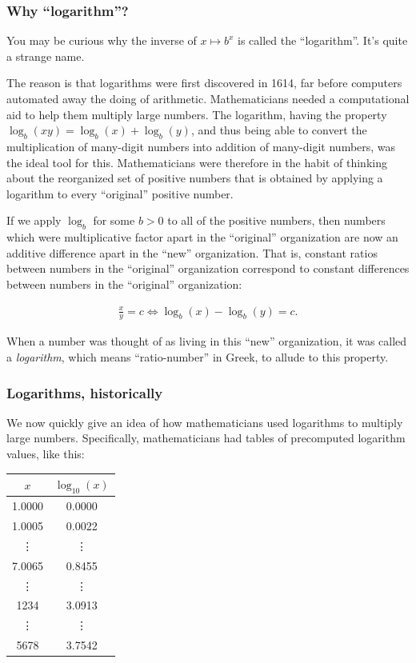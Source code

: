 \subsubsection*{Why ``logarithm''?}

You may be curious why the inverse of $x \mapsto b^x$ is called the ``logarithm''. It's quite a strange name.

The reason is that logarithms were first discovered in 1614, far before computers automated away the doing of arithmetic. Mathematicians needed a computational aid to help them multiply large numbers. The logarithm, having the property $\log_b(xy) = \log_b(x) + \log_b(y)$, and thus being able to convert the multiplication of many-digit numbers into addition of many-digit numbers, was the ideal tool for this. Mathematicians were therefore in the habit of thinking about the reorganized set of positive numbers that is obtained by applying a logarithm to every ``original'' positive number.

If we apply $\log_b$ for some $b > 0$ to all of the positive numbers, then numbers which were multiplicative factor apart in the ``original'' organization are now an additive difference apart in the ``new'' organization. That is, constant ratios between numbers in the ``original'' organization correspond to constant differences between numbers in the ``original'' organization:

\begin{align*}
    \frac{x}{y} = c \iff \log_b(x) - \log_b(y) = c.
\end{align*}

When a number was thought of as living in this ``new'' organization, it was called a  \textit{logarithm}, which means ``ratio-number'' in Greek, to allude to this property.

\subsubsection*{Logarithms, historically}

We now quickly give an idea of how mathematicians used logarithms to multiply large numbers. Specifically, mathematicians had tables of precomputed logarithm values, like this:

\begin{table}[h]
\centering
\begin{tabular}{|c|c|}
    \hline
    \textbf{$x$} & \textbf{$\log_{10}(x)$} \\
    \hline
        1.0000 & 0.0000 \\
    \hline
        1.0005 & 0.0022 \\
    \hline
        \vdots & \vdots \\
    \hline
        7.0065 & 0.8455 \\
    \hline
    \vdots & \vdots \\
    \hline
        1234 & 3.0913 \\
    \hline
    \vdots & \vdots \\
    \hline
        5678 & 3.7542 \\
    \hline
\end{tabular}
\label{tab:sample}
\end{table}

